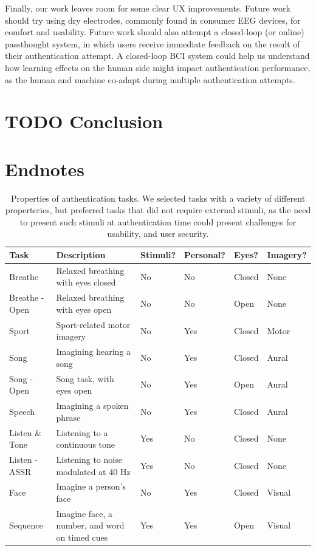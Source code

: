 \documentclass[letterpaper,twocolumn,10pt]{article}
\begin{document}
Finally, our work leaves room for some clear UX improvements.
Future work should try using dry electrodes, commonly found in consumer EEG devices, for comfort and usability.
Future work should also attempt a closed-loop (or online) passthought system, in which users receive immediate feedback on the result of their authentication attempt. A closed-loop BCI system could help us understand how learning effects
on the human side might impact authentication performance, as the human and machine co-adapt during multiple authentication attempts.

\section{TODO Conclusion}

\section{Endnotes}

\begin{table}[h]
\centering
\begin{tabularx}{\textwidth}{llllll}
Task & Description & Stimuli? & Personal? & Eyes? & Imagery?\\
\hline
Breathe & Relaxed breathing with eyes closed & No & No & Closed & None\\
Breathe - Open & Relaxed breathing with eyes open & No & No & Open & None\\
Sport & Sport-related motor imagery & No & Yes & Closed & Motor\\
Song & Imagining hearing a song & No & Yes & Closed & Aural\\
Song - Open & Song task, with eyes open & No & Yes & Open & Aural\\
Speech & Imagining a spoken phrase & No & Yes & Closed & Aural\\
Listen \& Tone & Listening to a continuous tone & Yes & No & Closed & None\\
Listen - ASSR & Listening to noise modulated at 40 Hz & Yes & No & Closed & None\\
Face & Imagine a person's face & No & Yes & Closed & Visual\\
Sequence & Imagine face, a number, and word on timed cues & Yes & Yes & Open & Visual\\
\hline
\end{tabularx}
\caption{Properties of authentication tasks. We selected tasks with a variety of different properteries, but preferred tasks that did not require external stimuli, as the need to present such stimuli at authentication time could present challenges for usability, and user security.}
\label{tab:addlabel}%
\end{table}
\end{document}
